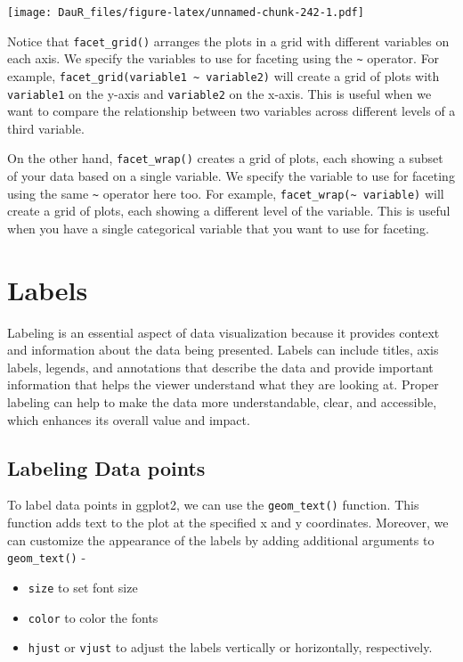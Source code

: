 \documentclass[
]{book}
\providecommand{\tightlist}{%
  \setlength{\itemsep}{0pt}\setlength{\parskip}{0pt}}
\begin{document}
\texttt{[image: DauR\_files/figure-latex/unnamed-chunk-242-1.pdf]}

Notice that \texttt{facet\_grid()} arranges the plots in a grid with different variables on each axis. We specify the variables to use for faceting using the \texttt{\textasciitilde{}} operator. For example, \texttt{facet\_grid(variable1\ \textasciitilde{}\ variable2)} will create a grid of plots with \texttt{variable1} on the y-axis and \texttt{variable2} on the x-axis. This is useful when we want to compare the relationship between two variables across different levels of a third variable.

On the other hand, \texttt{facet\_wrap()} creates a grid of plots, each showing a subset of your data based on a single variable. We specify the variable to use for faceting using the same \texttt{\textasciitilde{}} operator here too. For example, \texttt{facet\_wrap(\textasciitilde{}\ variable)} will create a grid of plots, each showing a different level of the variable. This is useful when you have a single categorical variable that you want to use for faceting.

\hypertarget{labels}{%
\section{Labels}\label{labels}}

Labeling is an essential aspect of data visualization because it provides context and information about the data being presented. Labels can include titles, axis labels, legends, and annotations that describe the data and provide important information that helps the viewer understand what they are looking at. Proper labeling can help to make the data more understandable, clear, and accessible, which enhances its overall value and impact.

\hypertarget{labeling-data-points}{%
\subsection{Labeling Data points}\label{labeling-data-points}}

To label data points in ggplot2, we can use the \texttt{geom\_text()} function. This function adds text to the plot at the specified x and y coordinates. Moreover, we can customize the appearance of the labels by adding additional arguments to \texttt{geom\_text()} -

\begin{itemize}
\tightlist
\item
  \texttt{size} to set font size
\item
  \texttt{color} to color the fonts
\item
  \texttt{hjust} or \texttt{vjust} to adjust the labels vertically or horizontally, respectively.
\end{itemize}
\end{document}
